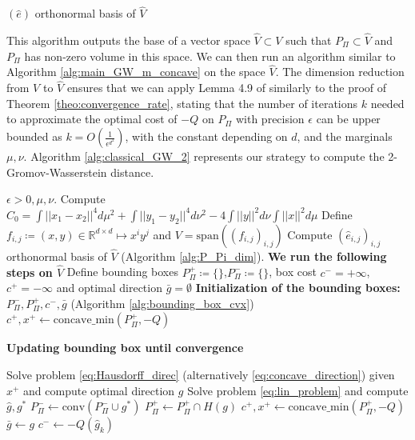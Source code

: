 \documentclass{article}
\newcommand{\R}{\mathbb{R}}
\newcommand{\1}{\mathbf{1}}
\newcommand{\GW}{\mathrm{GW}}
\theoremstyle{definition}
\theoremstyle{remark}
\begin{document}
\begin{appendices}
\begin{algorithm}
\begin{algorithmic}[1]
\State\Return $(\hat{e})$ orthonormal basis of $\hat{V}$
\end{algorithmic}
\end{algorithm}

This algorithm outputs the base of a vector space $\hat{V}\subset V$ such that $P_\Pi\subset \hat{V}$ and $P_\Pi$ has non-zero volume in this space.  We can then run an algorithm similar to Algorithm \ref{alg:main_GW_m_concave} on the space $\hat{V}$. The dimension reduction from $V$ to $\hat{V}$ ensures that we can apply Lemma 4.9 of \cite{lammel2023convergence} similarly to the proof of Theorem \ref{theo:convergence_rate}, stating that  the number of  iterations $k$ needed to approximate the optimal cost  of $-Q$ on $P_\Pi$ with precision $\epsilon$ can be upper bounded as $k=O \left(\frac{1}{\epsilon^{d^2}}\right)$, with the constant depending on $d$,  and  the marginals $\mu,\nu$. Algorithm \ref{alg:classical_GW_2} represents our strategy to compute the 2-Gromov-Wasserstein distance. 

\begin{algorithm}
\caption{Algorithm to approximate the 2-$\GW$ cost in dimension $d$}\label{alg:classical_GW_2}
\begin{algorithmic}[1]
\Require $\epsilon>0, \mu,\nu$.
\State Compute $C_0=\int||x_1-x_2||^4d\mu^{ 2}+\int||y_1-y_2||^4d\nu^{ 2} - 4 \int||y||^2d\nu\int||x||^2d\mu$
\State Define $f_{i,j}\coloneqq (x,y)\in \R^{d\times d}\mapsto x^iy^j$ and $V=\mathrm{span}((f_{i,j})_{i,j})$
\State Compute $({\hat {e}}_{i,j})_{i,j}$  orthonormal basis of $\hat{V}$ (Algorithm \ref{alg:P_Pi_dim}).
\State \textbf{We run the following steps on $\hat{V}$}
\State Define bounding boxes $P_\Pi^+\coloneqq\{\}$,$P_\Pi^-\coloneqq\{\}$, box cost $c^- = +\infty$, $c^+ = -\infty$ and optimal direction $\bar{g}=\emptyset$
 \State  \textbf{Initialization of the bounding boxes: }  $P_\Pi^-,P_\Pi^+,c^-, \bar{g}$ (Algorithm \ref{alg:bounding_box_cvx})
\State $c^+,x^+\gets \mathrm{concave\_min}(P_\Pi^+, -Q)$ 

 \State  \textbf{Updating bounding box until convergence }

    \State Solve problem \eqref{eq:Hausdorff_direc} (alternatively \eqref{eq:concave_direction}) given $x^+$ and compute optimal direction $g$ 
    \State Solve problem \eqref{eq:lin_problem} and compute $\hat{g},g^*$ 
    \State $P_\Pi^-\gets \mathrm{conv} (P_\Pi^-\cup g^*)$  
    \State $P_\Pi^+\gets P_\Pi^+\cap H(g)$ 
    \State $c^+,x^+\gets \mathrm{concave\_min}(P_\Pi^+, -Q)$ 
    \State $\bar{g}\gets g$
    \State $c^-\gets -Q(\hat{g}_{ k})$
    \EndIf
\EndWhile



\end{algorithmic}
\end{algorithm}
\end{appendices}
\end{document}
